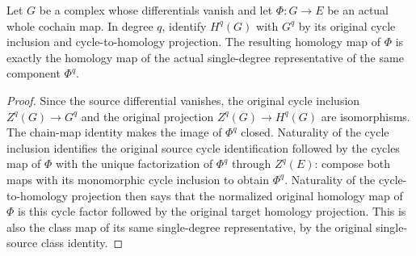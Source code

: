 \begin{lemma}
\label{lem:di-zero-source-single-class}
\leanok
Let $G$ be a complex whose differentials vanish and let $\Phi:G\to E$
be an actual whole cochain map. In degree $q$, identify $H^q(G)$ with
$G^q$ by its original cycle inclusion and cycle-to-homology projection.
The resulting homology map of $\Phi$ is exactly the homology map of the
actual single-degree representative of the same component $\Phi^q$.
\end{lemma}
\begin{proof}
Since the source differential vanishes, the original cycle inclusion
$Z^q(G)\to G^q$ and the original projection $Z^q(G)\to H^q(G)$ are
isomorphisms. The chain-map identity makes the image of $\Phi^q$
closed. Naturality of the cycle inclusion identifies the original
source cycle identification followed by the cycles map of $\Phi$
with the unique factorization of $\Phi^q$ through $Z^q(E)$: compose
both maps with its monomorphic cycle inclusion to obtain $\Phi^q$.
Naturality of the cycle-to-homology projection then says that the
normalized original homology map of $\Phi$ is this cycle factor
followed by the original target homology projection. This is also the
class map of its same single-degree representative, by the original
single-source class identity.
\end{proof}

